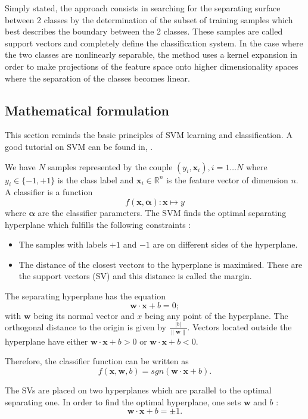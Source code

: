 Simply stated, the approach consists in searching for the separating
surface between 2 classes by the determination of the subset of
training samples which best describes the boundary between the 2
classes. These samples are called support vectors and completely
define the classification system. In the case where the two classes are
nonlinearly separable, the method uses a kernel expansion in order to make
projections of the feature space onto higher dimensionality spaces
where the separation of the classes becomes linear.

 \subsection{Mathematical formulation}

 This section reminds the basic principles of SVM learning and
 classification. A good tutorial on SVM can be found in, \cite{burges}.
 
We have $N$ samples represented by the couple $(y_i,\mathbf{x}_i),
i=1\ldots N$ where $y_i \in \{-1,+1\}$ is the class label and
$\mathbf{x}_i \in \mathbb{R}^n$ is the feature vector of dimension
$n$. A classifier is a function  $$f(\mathbf{x},\boldsymbol{\alpha}) :
\mathbf{x}\mapsto y$$ where $\boldsymbol{\alpha}$ are the classifier
parameters. The SVM finds the optimal separating hyperplane which
fulfills the following constraints :
    \begin{itemize}
      \item The samples with labels $+1$ and $-1$ are on different
      sides of the hyperplane.
      \item The distance of the closest vectors to the hyperplane is
      maximised. These are the support vectors (SV) and this distance is
      called the margin.
    \end{itemize}

    The separating hyperplane has the equation
    $$\mathbf{w}\cdot\mathbf{x}+b=0;$$ with $\mathbf{w}$ being its
    normal vector and $x$ being any point of the hyperplane. The
    orthogonal distance to the origin is given by
    $\frac{|b|}{\|\mathbf{w}\|}$. Vectors located outside the
    hyperplane have either $\mathbf{w}\cdot\mathbf{x}+b>0$ or
      $\mathbf{w}\cdot\mathbf{x}+b<0$.

    Therefore, the classifier function can be written as
    $$f(\mathbf{x},\mathbf{w}, b)=sgn(\mathbf{w}\cdot\mathbf{x}+b).$$
    
The SVs are placed on two hyperplanes which are parallel to the
      optimal separating one. In order to find the optimal
      hyperplane, one sets $\mathbf{w}$ and
      $b$ : $$\mathbf{w}\cdot\mathbf{x}+b=\pm 1.$$

